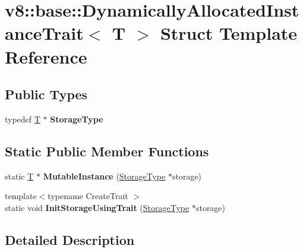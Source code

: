 \hypertarget{structv8_1_1base_1_1DynamicallyAllocatedInstanceTrait}{}\section{v8\+:\+:base\+:\+:Dynamically\+Allocated\+Instance\+Trait$<$ T $>$ Struct Template Reference}
\label{structv8_1_1base_1_1DynamicallyAllocatedInstanceTrait}
\subsection*{Public Types}
\begin{DoxyCompactItemize}
\item 
\mbox{\label{structv8_1_1base_1_1DynamicallyAllocatedInstanceTrait_a57084ee367a46e0cd2c94b409ae060f8}} 
typedef \mbox{\hyperlink{classv8_1_1internal_1_1torque_1_1T}{T}} $\ast$ {\bfseries Storage\+Type}
\end{DoxyCompactItemize}
\subsection*{Static Public Member Functions}
\begin{DoxyCompactItemize}
\item 
\mbox{\label{structv8_1_1base_1_1DynamicallyAllocatedInstanceTrait_a10b71279ad96ca2d4260c341ba961bde}} 
static \mbox{\hyperlink{classv8_1_1internal_1_1torque_1_1T}{T}} $\ast$ {\bfseries Mutable\+Instance} (\mbox{\hyperlink{classv8_1_1internal_1_1torque_1_1T}{Storage\+Type}} $\ast$storage)
\item 
\mbox{\label{structv8_1_1base_1_1DynamicallyAllocatedInstanceTrait_a42956a3fa67d94f0e1d4fc8c2a5d7709}} 
{\footnotesize template$<$typename Create\+Trait $>$ }\\static void {\bfseries Init\+Storage\+Using\+Trait} (\mbox{\hyperlink{classv8_1_1internal_1_1torque_1_1T}{Storage\+Type}} $\ast$storage)
\end{DoxyCompactItemize}


\subsection{Detailed Description}
